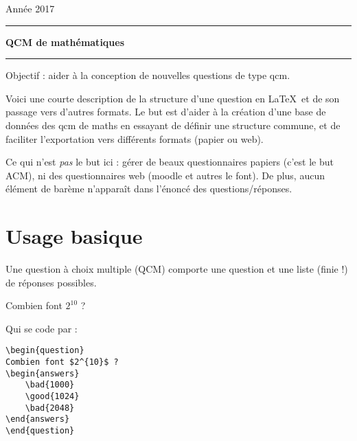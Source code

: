 \documentclass[12pt,a4paper]{article}
\begin{document}
 
 


\hfill\textsf{Ann\'ee 2017}

\vspace*{0.5ex}
\hrule\vspace*{1.5ex} 
\hfil\textsf{\textbf{\Large QCM de mathématiques}}
\vspace*{1ex} \hrule 
\vspace*{5ex} 


Objectif : aider à la conception de nouvelles questions de type qcm.

\bigskip

Voici une courte description de la structure d'une question en \LaTeX\ et de son passage vers d'autres formats. Le but est d'aider à la création d'une base de données des qcm de maths en essayant de définir une structure commune, et de faciliter l'exportation vers différents formats (papier ou web).

\bigskip

Ce qui n'est \emph{pas} le but ici : gérer de beaux questionnaires papiers (c'est le but ACM), ni des questionnaires web (moodle et autres le font). De plus, aucun élément de barème n'apparaît dans l'énoncé des questions/réponses. 



\section{Usage basique}

Une question à choix multiple (QCM) comporte une question et une liste (finie !) de réponses possibles.


\begin{center}
\begin{minipage}{0.8\textwidth}
\begin{question}
Combien font $2^{10}$ ?
\begin{answers}
\end{answers}
\end{question}
\end{minipage}
\end{center}

Qui se code par :
\begin{center}
\begin{minipage}{0.8\textwidth}
\begin{verbatim}
\begin{question}
Combien font $2^{10}$ ?
\begin{answers}
    \bad{1000}
    \good{1024}
    \bad{2048}
\end{answers}
\end{question}
\end{verbatim}
\end{minipage}
\end{center}
\end{document}
